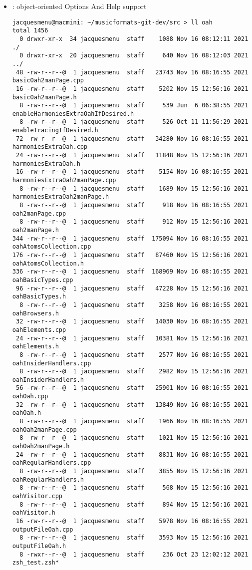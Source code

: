 \begin{itemize}
\item {} : object-oriented Options And Help support
\begin{lstlisting}[language=Terminal]
jacquesmenu@macmini: ~/musicformats-git-dev/src > ll oah
total 1456
  0 drwxr-xr-x  34 jacquesmenu  staff    1088 Nov 16 08:12:11 2021 ./
  0 drwxr-xr-x  20 jacquesmenu  staff     640 Nov 16 08:12:03 2021 ../
 48 -rw-r--r--@  1 jacquesmenu  staff   23743 Nov 16 08:16:55 2021 basicOah2manPage.cpp
 16 -rw-r--r--@  1 jacquesmenu  staff    5202 Nov 15 12:56:16 2021 basicOah2manPage.h
  8 -rw-r--r--@  1 jacquesmenu  staff     539 Jun  6 06:38:55 2021 enableHarmoniesExtraOahIfDesired.h
  8 -rw-r--r--@  1 jacquesmenu  staff     526 Oct 11 11:56:29 2021 enableTracingIfDesired.h
 72 -rw-r--r--@  1 jacquesmenu  staff   34280 Nov 16 08:16:55 2021 harmoniesExtraOah.cpp
 24 -rw-r--r--@  1 jacquesmenu  staff   11848 Nov 15 12:56:16 2021 harmoniesExtraOah.h
 16 -rw-r--r--@  1 jacquesmenu  staff    5154 Nov 16 08:16:55 2021 harmoniesExtraOah2manPage.cpp
  8 -rw-r--r--@  1 jacquesmenu  staff    1689 Nov 15 12:56:16 2021 harmoniesExtraOah2manPage.h
  8 -rw-r--r--@  1 jacquesmenu  staff     918 Nov 16 08:16:55 2021 oah2manPage.cpp
  8 -rw-r--r--@  1 jacquesmenu  staff     912 Nov 15 12:56:16 2021 oah2manPage.h
344 -rw-r--r--@  1 jacquesmenu  staff  175094 Nov 16 08:16:55 2021 oahAtomsCollection.cpp
176 -rw-r--r--@  1 jacquesmenu  staff   87460 Nov 15 12:56:16 2021 oahAtomsCollection.h
336 -rw-r--r--@  1 jacquesmenu  staff  168969 Nov 16 08:16:55 2021 oahBasicTypes.cpp
 96 -rw-r--r--@  1 jacquesmenu  staff   47228 Nov 15 12:56:16 2021 oahBasicTypes.h
  8 -rw-r--r--@  1 jacquesmenu  staff    3258 Nov 16 08:16:55 2021 oahBrowsers.h
 32 -rw-r--r--@  1 jacquesmenu  staff   14030 Nov 16 08:16:55 2021 oahElements.cpp
 24 -rw-r--r--@  1 jacquesmenu  staff   10381 Nov 15 12:56:16 2021 oahElements.h
  8 -rw-r--r--@  1 jacquesmenu  staff    2577 Nov 16 08:16:55 2021 oahInsiderHandlers.cpp
  8 -rw-r--r--@  1 jacquesmenu  staff    2982 Nov 15 12:56:16 2021 oahInsiderHandlers.h
 56 -rw-r--r--@  1 jacquesmenu  staff   25901 Nov 16 08:16:55 2021 oahOah.cpp
 32 -rw-r--r--@  1 jacquesmenu  staff   13849 Nov 16 08:16:55 2021 oahOah.h
  8 -rw-r--r--@  1 jacquesmenu  staff    1966 Nov 16 08:16:55 2021 oahOah2manPage.cpp
  8 -rw-r--r--@  1 jacquesmenu  staff    1021 Nov 15 12:56:16 2021 oahOah2manPage.h
 24 -rw-r--r--@  1 jacquesmenu  staff    8831 Nov 16 08:16:55 2021 oahRegularHandlers.cpp
  8 -rw-r--r--@  1 jacquesmenu  staff    3855 Nov 15 12:56:16 2021 oahRegularHandlers.h
  8 -rw-r--r--@  1 jacquesmenu  staff     568 Nov 15 12:56:16 2021 oahVisitor.cpp
  8 -rw-r--r--@  1 jacquesmenu  staff     894 Nov 15 12:56:16 2021 oahVisitor.h
 16 -rw-r--r--@  1 jacquesmenu  staff    5978 Nov 16 08:16:55 2021 outputFileOah.cpp
  8 -rw-r--r--@  1 jacquesmenu  staff    3593 Nov 15 12:56:16 2021 outputFileOah.h
  8 -rwxr--r--@  1 jacquesmenu  staff     236 Oct 23 12:02:12 2021 zsh_test.zsh*
\end{lstlisting}


\end{itemize}
